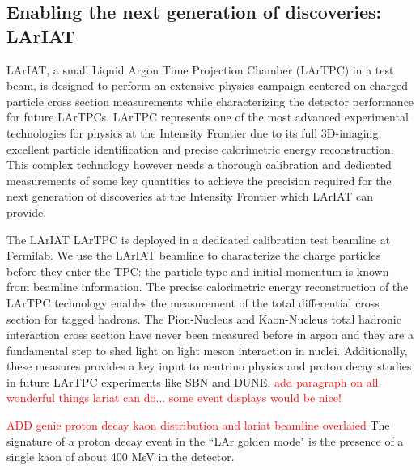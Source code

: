 \subsection{Enabling the next generation of discoveries: LArIAT}
LArIAT, a small Liquid Argon Time Projection Chamber (LArTPC) in a test beam,  is designed to perform an extensive physics campaign centered on charged particle cross section measurements while characterizing the detector performance for future LArTPCs. LArTPC represents one of the most advanced experimental technologies for physics at the Intensity Frontier due to its full 3D-imaging, excellent particle identification and precise calorimetric energy reconstruction. This complex technology however needs a thorough calibration and dedicated measurements of some key quantities to achieve the precision required for the next generation of discoveries at the Intensity Frontier which LArIAT can provide. 

The LArIAT LArTPC is deployed in a dedicated calibration test beamline at Fermilab.
We use the LArIAT beamline to characterize the charge particles before they enter the TPC: the particle type and initial momentum is known from beamline information. The precise calorimetric energy reconstruction of the LArTPC technology enables the measurement of the total differential cross section for  tagged hadrons. 
The Pion-Nucleus and Kaon-Nucleus total hadronic interaction cross section have never been measured before in argon and they are a fundamental step to shed light on light meson interaction in nuclei. Additionally, these measures provides a key input to neutrino physics and proton decay studies in future LArTPC experiments like SBN and DUNE.
\textcolor{red}{add paragraph on all wonderful things lariat can do... some event displays would be nice!}



\textcolor{red}{ADD genie proton decay kaon distribution and lariat beamline overlaied}
The signature of a proton decay event in the ``LAr golden mode" is the presence of a single kaon of about 400 MeV in the detector. 
